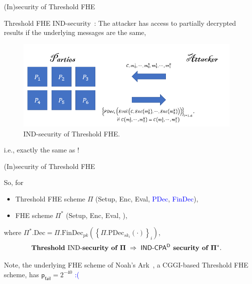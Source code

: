 \documentclass{beamer}
\begin{document}
	\begin{frame}{(In)security of Threshold FHE}

        Threshold FHE IND-security~\cite{cryptoeprint:2017/257}: The attacker has access to partially decrypted results if the underlying messages are the same,\vspace{0.4cm}
        
        \begin{figure}[h]
            \centering
            \includegraphics[width=\linewidth]{ThreshFHE.png}
            \caption{IND-security of Threshold FHE. }
        \end{figure}

        i.e., exactly the same as \indcpad!
	\end{frame}

	\begin{frame}{(In)security of Threshold FHE}

        So, for
		\begin{itemize}
			\item Threshold FHE scheme $\Pi$ (Setup, Enc, Eval, \textcolor{blue}{PDec}, \textcolor{blue}{FinDec}),
			\item FHE scheme $\Pi^*$ (Setup, Enc, Eval, ), 
		\end{itemize}
        where $\Pi^*.\text{Dec} = \Pi.\text{FinDec}_{pk} \left(\left\{\Pi.\text{PDec}_{sk_i}(\cdot)\right\}_i\right)$, \vspace{0.3cm}
		\[\bf
            \textbf{Threshold {\normalfont IND-}security of } \Pi ~\Rightarrow~ \text{\sf IND-CPA$\sf ^D$} \textbf{ security of } \Pi^*.
        \]\vspace{0.3cm}\pause

        Note, the underlying FHE scheme of Noah's Ark~\cite{cryptoeprint:2023/815}, a CGGI-based Threshold FHE scheme, has $\mathsf{p}_\mathsf{fail} = 2^{-40}$ \textcolor{blue}{:(}
	\end{frame}
 
\end{document}
